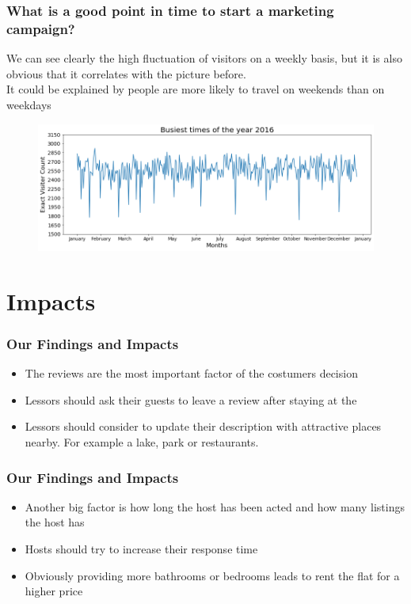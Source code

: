 \documentclass{beamer}
\begin{document}
\begin{frame}
\frametitle{What is a good point in time to start a marketing campaign?}
We can see clearly the high fluctuation of visitors on a weekly basis, but it is also obvious that it correlates with the picture before.\\It could be explained by people are more likely to travel on weekends than on weekdays
\begin{figure}
\includegraphics[width=0.8\linewidth]{photo/5_busiest_times_2016}
\end{figure}
\end{frame}
\section{Impacts}
\begin{frame}
\frametitle{Our Findings and Impacts}
\begin{itemize}
\item The reviews are the most important factor of the costumers decision
\item Lessors should ask their guests to leave a review after staying at the 
\item Lessors should consider to update their description with attractive places nearby. For example a lake, park or restaurants.
\end{itemize}
\end{frame}
\begin{frame}
\frametitle{Our Findings and Impacts}
\begin{itemize}
\item Another big factor is how long the host has been acted and how many listings the host has
\item Hosts should try to increase their response time
\item Obviously providing more bathrooms or bedrooms leads to rent the flat for a higher price
\end{itemize}
\end{frame}
\end{document}
